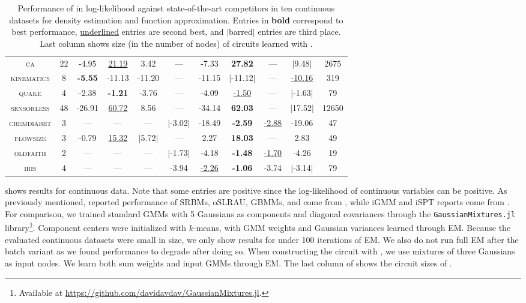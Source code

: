 \begin{table}[t]
{\begin{tabular}{cc|ccccccc|cc}
    \textsc{ca}         & 22 & -4.95  & \underline{21.19}  & 3.42   & ---   & -7.33    & \textbf{27.82}   & ---   & $|$9.48$|$   & 2675  \\
    \textsc{kinematics} & 8  & \textbf{-5.55}  & -11.13 & -11.20 & ---   & -11.15   & $|$-11.12$|$  & ---   & \underline{-10.16} & 319   \\
    \textsc{quake}      & 4  & -2.38  & \textbf{-1.21}  & -3.76  & ---   & -4.09    & \underline{-1.50}   & ---   & $|$-1.63$|$  & 79    \\
    \textsc{sensorless} & 48 & -26.91 & \underline{60.72}  & 8.56   & ---   & -34.14   & \textbf{62.03}   & ---   & $|$17.52$|$  & 12650 \\
    \textsc{chemdiabet} & 3  & ---    & ---    & ---    & $|$-3.02$|$ & -18.49   & \textbf{-2.59}   & \underline{-2.88} & -19.06 & 47    \\
    \textsc{flowsize}   & 3  & -0.79  & \underline{15.32}  & $|$5.72$|$   & ---   & 2.27     & \textbf{18.03}   & ---   & 2.83   & 49    \\
    \textsc{oldfaith}   & 2  & ---    & ---    & ---    & $|$-1.73$|$ & -4.18    & \textbf{-1.48}   & \underline{-1.70} & -4.26  & 19    \\
    \textsc{iris}       & 4  & ---    & ---    & ---    & -3.94 & \underline{-2.26}    & \textbf{-1.06}   & -3.74 & $|$-3.14$|$  & 79    \\
    \hline
  \end{tabular}
  }
  \caption{Performance of  in log-likelihood against state-of-the-art competitors
    in ten continuous datasets for density estimation and function approximation. Entries in
    \textbf{\textup{bold}} correspond to best performance, \underline{\textup{underlined}} entries
    are second best, and $|$\textup{barred}$|$ entries are third place. Last column shows size (in
    the number of nodes) of circuits learned with .}
  \label{tab:cont}
\end{table}

 shows results for continuous data. Note that some entries are positive since the
log-likelihood of continuous variables can be positive. As previously mentioned, reported
performance of SRBMs, oSLRAU, GBMMs, and  come from \citet{jaini18a}, while
iGMM and iSPT reports come from \citet{trapp16}. For comparison, we trained standard GMMs with 5
Gaussians as components and diagonal covariances through the \texttt{GaussianMixtures.jl}
library\footnote{Available at \url{https://github.com/davidavdav/GaussianMixtures.jl}.}. Component
centers were initialized with $k$-means, with GMM weights and Gaussian variances learned through
EM. Because the evaluated continuous datasets were small in size, we only show results for
 under 100 iterations of EM. We also do not run full EM after the batch variant
as we found performance to degrade after doing so. When constructing the circuit with
, we use mixtures of three Gaussians as input nodes. We learn both sum weights
and input GMMs through EM. The last column of  shows the circuit sizes of
.


